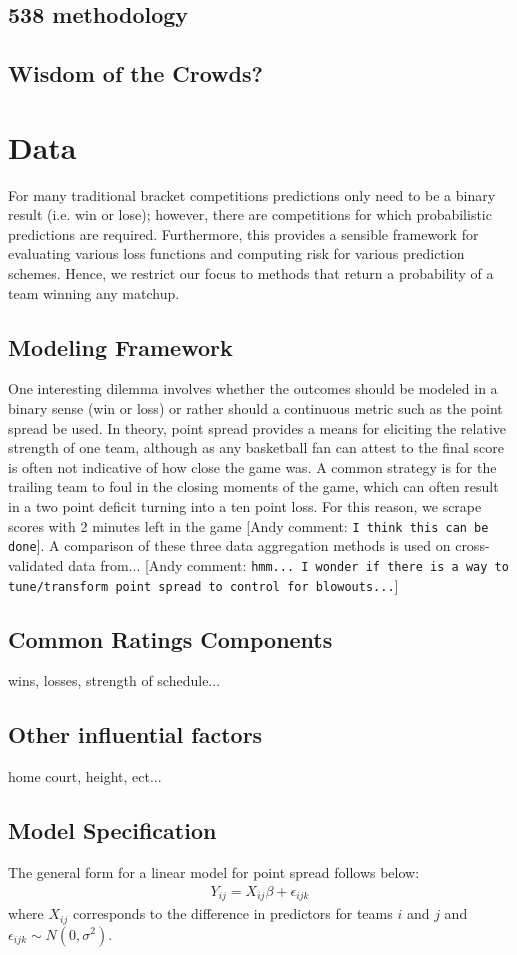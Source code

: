 \documentclass[11pt]{article} %
\newcommand{\andyc}[1]{[{\color{red}\sc Andy comment: {\tt #1}}]}
\begin{document}
\subsection{538 methodology}
\subsection{Wisdom of the Crowds?}
\section{Data}
For many traditional bracket competitions predictions only need to be a binary result (i.e. win or lose); however, there are competitions for which probabilistic predictions  are required.  Furthermore, this provides a sensible framework for evaluating various loss functions and computing risk for various prediction schemes.  Hence, we restrict our focus to methods that return a probability of a team winning any matchup.
\subsection{Modeling Framework}
One interesting dilemma involves whether the outcomes should be modeled in a binary sense (win or loss) or rather should a continuous metric such as the point spread be used.  In theory, point spread provides a means for eliciting the relative strength of one team, although as any basketball fan can attest to the final score is often not indicative of how close the game was.  A common strategy is for the trailing team to foul in the closing moments of the game, which can often result in a two point deficit turning into a ten point loss.  For this reason, we scrape scores with 2 minutes left in the game \andyc{I think this can be done}.  A comparison of these three data aggregation methods is used on cross-validated data from... \andyc{hmm... I wonder if there is a way to tune/transform point spread to control for blowouts...}
\subsection{Common Ratings Components} wins, losses, strength of schedule...

\subsection{Other influential factors} home court, height, ect...
\subsection{Model Specification}
The general form for a linear model for point spread follows below:
\begin{eqnarray}
Y_{ij} = X_{ij} \beta + \epsilon_{ijk}
\label{eq:generic}
\end{eqnarray}
where $X_{ij}$ corresponds to the difference in predictors for teams $i$ and $j$ and $\epsilon_{ijk} \sim N(0,\sigma^2).$ 
\end{document}

